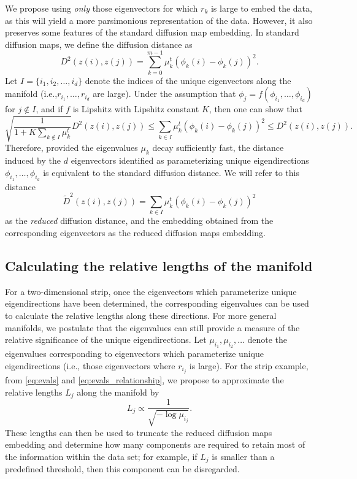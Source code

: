 \documentclass[3p]{elsarticle}
\begin{document}
We propose using {\em only} those eigenvectors for which $r_k$ is large to embed the data, as this will yield a more parsimonious representation of the data. 
%
However, it also preserves some features of the standard diffusion map embedding. 
%
In standard diffusion maps, we define the diffusion distance as
\begin{equation}
D^2(z(i), z(j)) = \sum_{k=0}^{m-1} \mu_k^t \left( \phi_k(i) - \phi_k(j)  \right)^2.
\end{equation}
%
Let $I = \{i_1, i_2, \dots, i_d \}$ denote the indices of the unique eigenvectors along the manifold (i.e.,$r_{i_1}, \dots, r_{i_d}$ are large). 
%
Under the assumption that $\phi_j = f \left( \phi_{i_1}, \dots, \phi_{i_d} \right)$ for $j \not\in I$, and if $f$ is Lipshitz with Lipshitz constant $K$, then one can show that 
\begin{equation}
\sqrt{\frac{1}{1+K \sum_{k \not\in I} \mu_k^t}} D^2(z(i), z(j)) \le \sum_{k \in I} \mu_k^t \left( \phi_k(i) - \phi_k(j)  \right)^2 \le D^2(z(i), z(j)).
\end{equation}
%
Therefore, provided the eigenvalues $\mu_k$ decay sufficiently fast, the distance induced by the $d$ eigenvectors identified as parameterizing unique eigendirections $\phi_{i_1}, \dots, \phi_{i_d}$ is equivalent to the standard diffusion distance. 
%
We will refer to this distance 
\begin{equation}
\tilde{D}^2(z(i), z(j)) = \sum_{k \in I} \mu_k^t \left( \phi_k(i) - \phi_k(j)  \right)^2
\end{equation}
%
as the {\em reduced} diffusion distance, and the embedding obtained from the corresponding eigenvectors as the reduced diffusion maps embedding. 
%

\subsection{Calculating the relative lengths of the manifold} \label{sec:relative_lengths}

For a two-dimensional strip, once the eigenvectors which parameterize unique eigendirections have been determined, the corresponding eigenvalues can be used to calculate the relative lengths along these directions. 
%
For more general manifolds, we postulate that the eigenvalues can still provide a measure of the relative significance of the unique eigendirections.
%
Let $\mu_{i_1}, \mu_{i_2}, \dots$ denote the eigenvalues corresponding to eigenvectors which parameterize unique eigendirections (i.e., those eigenvectors where $r_{i_j}$ is large). 
%
For the strip example, from \eqref{eq:evals} and \eqref{eq:evals_relationship}, we propose to approximate the relative lengths $L_j$  along the manifold by
\begin{equation} \label{eq:est_lengths}
L_j \propto \frac{1}{\sqrt{-\log \mu_{i_j}}}.
\end{equation}
%
These lengths can then be used to truncate the reduced diffusion maps embedding and determine how many components are required to retain most of the information within the data set; 
for example, if $L_j$ is smaller than a predefined threshold, then this component can be disregarded. 
\end{document}

